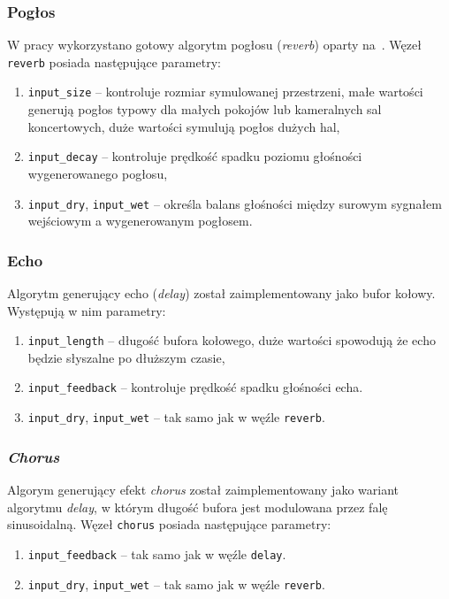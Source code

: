 \subsubsection{Pogłos}

W pracy wykorzystano gotowy algorytm pogłosu (\textit{reverb}) oparty na~\cite{reverb}.
Węzeł \texttt{reverb} posiada następujące parametry:
\begin{enumerate}
  \item \texttt{input\_size} -- kontroluje rozmiar symulowanej przestrzeni, małe
    wartości generują pogłos typowy dla małych pokojów lub kameralnych sal koncertowych,
    duże wartości symulują pogłos dużych hal,
  \item \texttt{input\_decay} -- kontroluje prędkość spadku poziomu
    głośności wygenerowanego pogłosu,
  \item \texttt{input\_dry}, \texttt{input\_wet} -- określa balans głośności
    między surowym sygnałem wejściowym a wygenerowanym pogłosem.
\end{enumerate}

\subsubsection{Echo}

Algorytm generujący echo (\textit{delay}) został zaimplementowany jako bufor kołowy. Występują
w nim parametry:
\begin{enumerate}
  \item \texttt{input\_length} -- długość bufora kołowego, duże wartości spowodują
    że echo będzie słyszalne po dłuższym czasie,
  \item \texttt{input\_feedback} -- kontroluje prędkość spadku głośności echa.
  \item \texttt{input\_dry}, \texttt{input\_wet} -- tak samo jak w węźle \texttt{reverb}.
\end{enumerate}

\subsubsection{\textit{Chorus}}

Algorym generujący efekt \textit{chorus} został zaimplementowany jako wariant algorytmu \textit{delay},
w którym długość bufora jest modulowana przez falę sinusoidalną. Węzeł \texttt{chorus}
posiada następujące parametry:

\begin{enumerate}
  \item \texttt{input\_feedback} -- tak samo jak w węźle \texttt{delay}.
  \item \texttt{input\_dry}, \texttt{input\_wet} -- tak samo jak w węźle \texttt{reverb}.
\end{enumerate}


